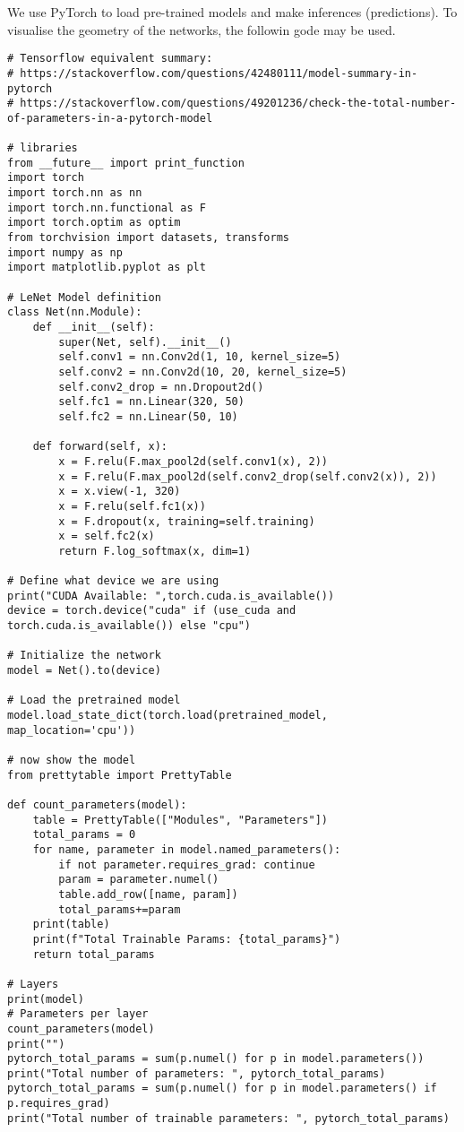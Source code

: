 We use PyTorch to load pre-trained models and make inferences (predictions).
To visualise the geometry of the networks, the followin gode may be used.
\begin{verbatim}
# Tensorflow equivalent summary:
# https://stackoverflow.com/questions/42480111/model-summary-in-pytorch
# https://stackoverflow.com/questions/49201236/check-the-total-number-of-parameters-in-a-pytorch-model

# libraries
from __future__ import print_function
import torch
import torch.nn as nn
import torch.nn.functional as F
import torch.optim as optim
from torchvision import datasets, transforms
import numpy as np
import matplotlib.pyplot as plt

# LeNet Model definition
class Net(nn.Module):
    def __init__(self):
        super(Net, self).__init__()
        self.conv1 = nn.Conv2d(1, 10, kernel_size=5)
        self.conv2 = nn.Conv2d(10, 20, kernel_size=5)
        self.conv2_drop = nn.Dropout2d()
        self.fc1 = nn.Linear(320, 50)
        self.fc2 = nn.Linear(50, 10)

    def forward(self, x):
        x = F.relu(F.max_pool2d(self.conv1(x), 2))
        x = F.relu(F.max_pool2d(self.conv2_drop(self.conv2(x)), 2))
        x = x.view(-1, 320)
        x = F.relu(self.fc1(x))
        x = F.dropout(x, training=self.training)
        x = self.fc2(x)
        return F.log_softmax(x, dim=1)
        
# Define what device we are using
print("CUDA Available: ",torch.cuda.is_available())
device = torch.device("cuda" if (use_cuda and torch.cuda.is_available()) else "cpu")

# Initialize the network
model = Net().to(device)

# Load the pretrained model
model.load_state_dict(torch.load(pretrained_model, map_location='cpu'))     

# now show the model
from prettytable import PrettyTable

def count_parameters(model):
    table = PrettyTable(["Modules", "Parameters"])
    total_params = 0
    for name, parameter in model.named_parameters():
        if not parameter.requires_grad: continue
        param = parameter.numel()
        table.add_row([name, param])
        total_params+=param
    print(table)
    print(f"Total Trainable Params: {total_params}")
    return total_params

# Layers
print(model) 
# Parameters per layer  
count_parameters(model)
print("")
pytorch_total_params = sum(p.numel() for p in model.parameters())
print("Total number of parameters: ", pytorch_total_params)
pytorch_total_params = sum(p.numel() for p in model.parameters() if p.requires_grad)
print("Total number of trainable parameters: ", pytorch_total_params)


\end{verbatim}
